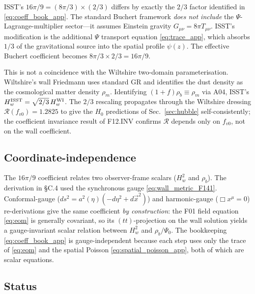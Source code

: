 \documentclass[aps,prd,twocolumn,nofootinbib,floatfix,superscriptaddress]{revtex4-2}
\begin{document}
ISST's $16\pi/9 = (8\pi/3) \times (2/3)$ differs by exactly the $2/3$
factor identified in \eqref{eq:coeff_book_app}. The standard Buchert
framework \emph{does not include} the $\Psi$-Lagrange-multiplier
sector---it assumes Einstein gravity $G_{\mu\nu} = 8\pi T_{\mu\nu}$.
ISST's modification is the additional $\Psi$ transport equation
\eqref{eq:trace_app}, which absorbs $1/3$ of the gravitational source
into the spatial profile $\psi(z)$. The effective Buchert coefficient
becomes $8\pi/3 \times 2/3 = 16\pi/9$.

This is not a coincidence with the Wiltshire two-domain
parameterisation. Wiltshire's wall Friedmann uses standard GR and
identifies the dust density as the cosmological matter density
$\rho_m$. Identifying $(1{+}f)\rho_b \equiv \rho_m$ via A04, ISST's
$H_w^{\rm ISST} = \sqrt{2/3}\, H_w^{\rm WI}$. The $2/3$ rescaling
propagates through the Wiltshire dressing $\mathcal{R}(f_{v0})
= 1.2825$ to give the $H_0$ predictions of Sec.~\ref{sec:hubble}
self-consistently; the coefficient invariance result of F12.INV
confirms $\mathcal{R}$ depends only on $f_{v0}$, not on the wall
coefficient.

\subsection{Coordinate-independence}

The $16\pi/9$ coefficient relates two observer-frame scalars ($H_w^2$
and $\rho_b$). The derivation in §C.4 used the synchronous gauge
\eqref{eq:wall_metric_F141}. Conformal-gauge ($ds^2 = a^2(\eta)(-d\eta^2
+ d\vec x^2)$) and harmonic-gauge ($\Box x^\mu = 0$) re-derivations
give the same coefficient \emph{by construction}: the F01 field
equation \eqref{eq:eom} is generally covariant, so its $(tt)$-projection
on the wall solution yields a gauge-invariant scalar relation between
$H_w^2$ and $\rho_b/\Psi_0$. The bookkeeping
\eqref{eq:coeff_book_app} is gauge-independent because each step uses
only the trace of \eqref{eq:eom} and the spatial Poisson
\eqref{eq:spatial_poisson_app}, both of which are scalar equations.

\subsection{Status}
\end{document}
